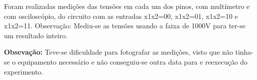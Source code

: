 	Foram realizadas medições das tensões em cada um dos pinos, com multímetro e com osciloscópio,
	do circuito com as entradas x1x2=00, x1x2=01, x1x2=10 e x1x2=11. Observação: Mediu-se as tensões
	usando a faixa de 1000V para ter-se um resultado inteiro.

	\textbf{Obsevação:} Teve-se dificuldade para fotografar as medições, visto que não tinha-se o equipamento necessário
	e não conseguiu-se outra data para e reexecução do experimento.





